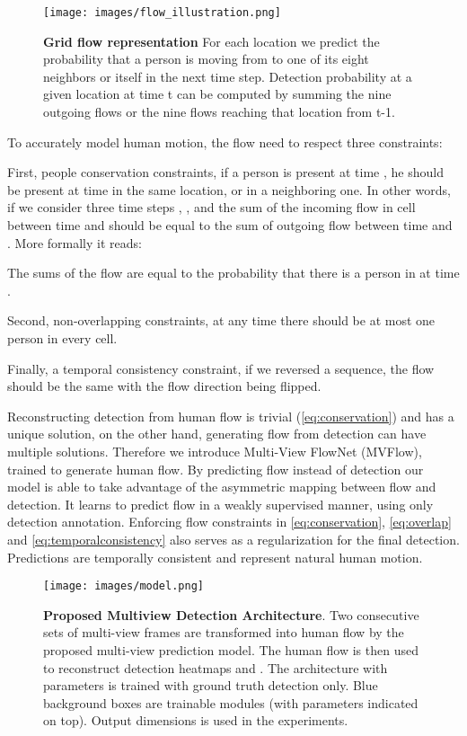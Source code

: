 \documentclass[10pt,twocolumn,letterpaper]{article}
\begin{document}
\begin{figure}
    \centering
      \texttt{[image: images/flow\_illustration.png]}
      \caption{\textbf{ Grid flow representation} For each location  we predict the probability that a person is moving from  to one of its eight neighbors or itself in the next time step.
      Detection probability at a given location at time t can be computed by summing the nine outgoing flows or the nine flows reaching that location from t-1.
      \label{fig:gridworld}
      }
    \end{figure}
     
To accurately model human motion, the flow need to respect three constraints:

First, people conservation constraints, if a person is present at time , he should be present at time  in the same location, 
or in a neighboring one. In other words, if we consider three time steps , , and  the sum of the incoming flow in cell  between time  and  
should be equal to the sum of outgoing flow between time  and . More formally it reads:

The sums of the flow are equal to  the probability that there is a person in  at time .

Second, non-overlapping constraints, at any time there should be at most one person in every cell.

Finally, a temporal consistency constraint, if we reversed a sequence, the flow should be the same with the flow direction being flipped.


Reconstructing detection from human flow is trivial (\cref{eq:conservation}) and has a unique solution, on the other hand, generating flow from detection can have multiple solutions. Therefore we introduce Multi-View FlowNet (MVFlow), trained to generate human flow.
By predicting flow instead of detection our model is able to take advantage of the asymmetric mapping between flow and detection. It learns to predict flow in a weakly supervised manner, using only detection annotation. 
Enforcing flow constraints in \cref{eq:conservation}, \cref{eq:overlap} and \cref{eq:temporalconsistency} also serves as a regularization for the final detection. Predictions are temporally consistent and represent natural human motion.




\begin{figure*}[t]
\begin{center}
\centering\texttt{[image: images/model.png]}
\end{center}
\caption{\textbf{Proposed Multiview Detection Architecture}. Two consecutive sets of multi-view frames are transformed into human flow  
by the proposed multi-view prediction model.
The human flow is then used to reconstruct detection heatmaps  and .
The architecture with parameters  is trained with ground truth detection only.
Blue background boxes are trainable modules (with parameters indicated on top). 
Output dimensions  is used in the experiments.
}
\label{fig:model}
\end{figure*} 
\end{document}
